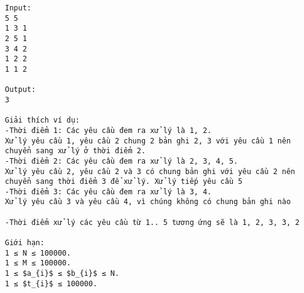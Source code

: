 \begin{verbatim}
Input:
5 5
1 3 1
2 5 1
3 4 2
1 2 2
1 1 2

Output:
3

Giải thích ví dụ: 
-Thời điểm 1: Các yêu cầu đem ra xử lý là 1, 2.
Xử lý yêu cầu 1, yêu cầu 2 chung 2 bản ghi 2, 3 với yêu cầu 1 nên chuyển sang xử lý ở thời điểm 2.
-Thời điểm 2: Các yêu cầu đem ra xử lý là 2, 3, 4, 5.
Xử lý yêu cầu 2, yêu cầu 2 và 3 có chung bản ghi với yêu cầu 2 nên chuyển sang thời điểm 3 để xử lý. Xử lý tiếp yêu cầu 5
-Thời điểm 3: Các yêu cầu đem ra xử lý là 3, 4.
Xử lý yêu cầu 3 và yêu cầu 4, vì chúng không có chung bản ghi nào

-Thời điểm xử lý các yêu cầu từ 1.. 5 tương ứng sẽ là 1, 2, 3, 3, 2

Giới hạn:
1 ≤ N ≤ 100000. 
1 ≤ M ≤ 100000.
1 ≤ $a_{i}$ ≤ $b_{i}$ ≤ N. 
1 ≤ $t_{i}$ ≤ 100000. 

\end{verbatim}